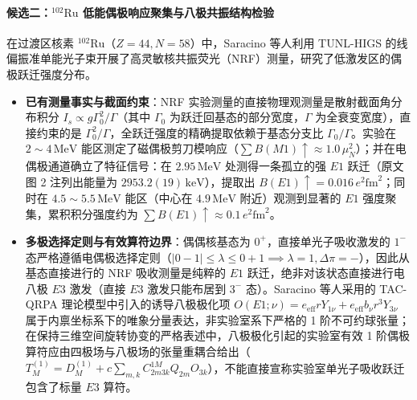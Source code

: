 \paragraph{候选二：$^{102}\mathrm{Ru}$ 低能偶极响应聚集与八极共振结构检验}
在过渡区核素 $^{102}\mathrm{Ru}$（$Z=44, N=58$）中，Saracino 等人利用 TUNL-HIGS 的线偏振准单能光子束开展了高灵敏核共振荧光（NRF）测量，研究了低激发区的偶极跃迁强度分布。\cite{saracino-2026-102ru-scissors-octupole-resonances}
\begin{itemize}
\item \textbf{已有测量事实与截面约束}：NRF 实验测量的直接物理观测量是散射截面角分布积分 $I_s \propto g \Gamma_0^2 / \Gamma$（其中 $\Gamma_0$ 为跃迁回基态的部分宽度，$\Gamma$ 为全衰变宽度），直接约束的是 $\Gamma_0^2/\Gamma$，全跃迁强度的精确提取依赖于基态分支比 $\Gamma_0/\Gamma$。实验在 $2\sim 4\,\mathrm{MeV}$ 能区测定了磁偶极剪刀模响应（$\sum B(M1)\!\uparrow \approx 1.0\,\mu_N^2$）；并在电偶极通道确立了特征信号：在 $2.95\,\mathrm{MeV}$ 处测得一条孤立的强 $E1$ 跃迁（原文图 2 注列出能量为 $2953.2(19)\,\mathrm{keV}$），提取出 $B(E1)\!\uparrow = 0.016\,e^2\mathrm{fm}^2$；同时在 $4.5\sim 5.5\,\mathrm{MeV}$ 能区（中心在 $4.9\,\mathrm{MeV}$ 附近）观测到显著的 $E1$ 强度聚集，累积积分强度约为 $\sum B(E1)\!\uparrow \approx 0.1\,e^2\mathrm{fm}^2$。
\item \textbf{多极选择定则与有效算符边界}：偶偶核基态为 $0^+$，直接单光子吸收激发的 $1^-$ 态严格遵循电偶极选择定则（$|0 - 1| \le \lambda \le 0 + 1 \implies \lambda = 1, \Delta\pi = -$），因此从基态直接进行的 NRF 吸收测量是纯粹的 $E1$ 跃迁，绝非对该状态直接进行电八极 $E3$ 激发（直接 $E3$ 激发只能布居到 $3^-$ 态）。Saracino 等人采用的 TAC-QRPA 理论模型中引入的诱导八极极化项 $O(E1;\nu) = e_{\mathrm{eff}} r Y_{1\nu} + e_{\mathrm{eff}} b_\nu r^3 Y_{3\nu}$ 属于内禀坐标系下的唯象分量表达，非实验室系下严格的 1 阶不可约球张量；在保持三维空间旋转协变的严格表述中，八极极化引起的实验室有效 1 阶偶极算符应由四极场与八极场的张量重耦合给出（$T_M^{(1)} = D_M^{(1)} + c \sum_{m,k} C_{2m 3k}^{1M} Q_{2m} O_{3k}$），不能直接宣称实验室单光子吸收跃迁包含了标量 $E3$ 算符。

\end{itemize}
